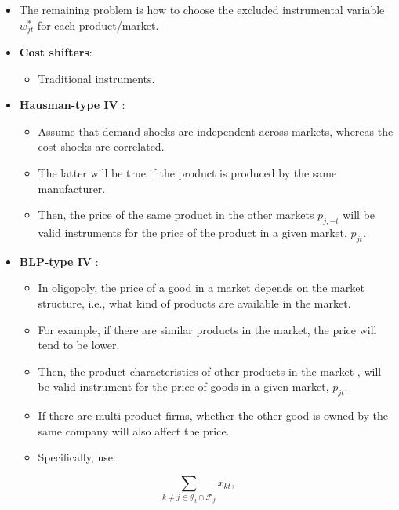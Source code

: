 \documentclass[
]{book}
\providecommand{\tightlist}{%
  \setlength{\itemsep}{0pt}\setlength{\parskip}{0pt}}
\begin{document}
\begin{itemize}
\tightlist
\item
  The remaining problem is how to choose the excluded instrumental variable \(w_{jt}^*\) for each product/market.
\item
  \textbf{Cost shifters}:

  \begin{itemize}
  \tightlist
  \item
    Traditional instruments.
  \end{itemize}
\item
  \textbf{Hausman-type IV} \citep{Hausman1994}:

  \begin{itemize}
  \tightlist
  \item
    Assume that demand shocks are independent across markets, whereas the cost shocks are correlated.
  \item
    The latter will be true if the product is produced by the same manufacturer.
  \item
    Then, the price of the same product in the other markets \(p_{j, -t}\) will be valid instruments for the price of the product in a given market, \(p_{jt}\).
  \end{itemize}
\item
  \textbf{BLP-type IV} \citep{berryAutomobilePricesMarket1995}:

  \begin{itemize}
  \tightlist
  \item
    In oligopoly, the price of a good in a market depends on the market structure, i.e., what kind of products are available in the market.
  \item
    For example, if there are similar products in the market, the price will tend to be lower.
  \item
    Then, the product characteristics of other products in the market , will be valid instrument for the price of goods in a given market, \(p_{jt}\).
  \item
    If there are multi-product firms, whether the other good is owned by the same company will also affect the price.
  \item
    Specifically, \citet{berryAutomobilePricesMarket1995} use:
  \end{itemize}
\end{itemize}

\begin{equation}
\sum_{k \neq j \in \mathcal{J}_t \cap \mathcal{F}_{f}} x_{kt},
\end{equation}
\end{document}
